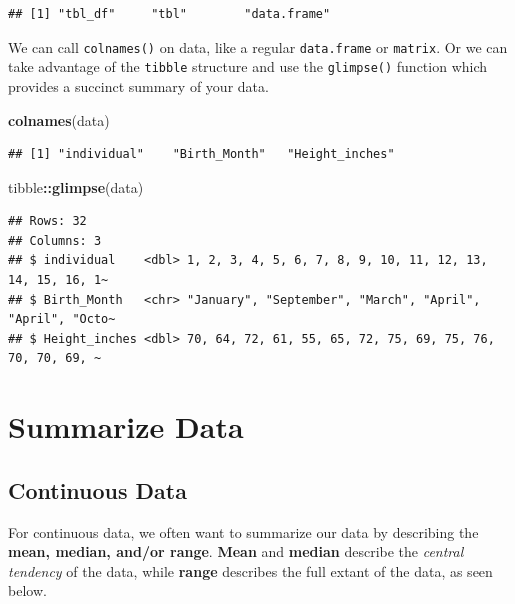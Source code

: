 \documentclass[
]{book}
\newenvironment{Shaded}{\begin{snugshade}}{\end{snugshade}}
\newcommand{\FunctionTok}[1]{\textcolor[rgb]{0.13,0.29,0.53}{\textbf{#1}}}
\newcommand{\NormalTok}[1]{#1}
\newcommand{\SpecialCharTok}[1]{\textcolor[rgb]{0.81,0.36,0.00}{\textbf{#1}}}
\begin{document}
\begin{verbatim}
## [1] "tbl_df"     "tbl"        "data.frame"
\end{verbatim}

We can call \texttt{colnames()} on data, like a regular \texttt{data.frame} or \texttt{matrix}. Or we can take advantage of the \texttt{tibble} structure and use the \texttt{glimpse()} function which provides a succinct summary of your data.

\begin{Shaded}
\begin{Highlighting}[]
\FunctionTok{colnames}\NormalTok{(data)}
\end{Highlighting}
\end{Shaded}

\begin{verbatim}
## [1] "individual"    "Birth_Month"   "Height_inches"
\end{verbatim}

\begin{Shaded}
\begin{Highlighting}[]
\NormalTok{tibble}\SpecialCharTok{::}\FunctionTok{glimpse}\NormalTok{(data)}
\end{Highlighting}
\end{Shaded}

\begin{verbatim}
## Rows: 32
## Columns: 3
## $ individual    <dbl> 1, 2, 3, 4, 5, 6, 7, 8, 9, 10, 11, 12, 13, 14, 15, 16, 1~
## $ Birth_Month   <chr> "January", "September", "March", "April", "April", "Octo~
## $ Height_inches <dbl> 70, 64, 72, 61, 55, 65, 72, 75, 69, 75, 76, 70, 70, 69, ~
\end{verbatim}

\hypertarget{summarize-data}{%
\section*{Summarize Data}\label{summarize-data}}

\hypertarget{continuous-data}{%
\subsection*{Continuous Data}\label{continuous-data}}

For continuous data, we often want to summarize our data by describing the \textbf{mean, median, and/or range}. \textbf{Mean} and \textbf{median} describe the \emph{central tendency} of the data, while \textbf{range} describes the full extant of the data, as seen below.
\end{document}
